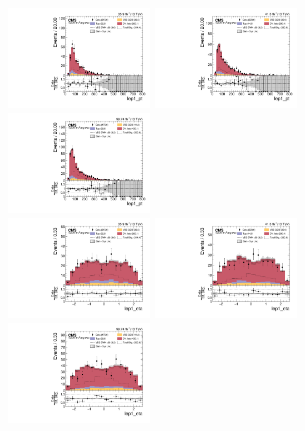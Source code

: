 \begin{figure}[!ht]
  \centering
  \includegraphics[width=0.335\textwidth]{analysis_plots/2016_zv/cr_vjets_m/lep1_pt.pdf} \hspace{-10pt}
  \includegraphics[width=0.335\textwidth]{analysis_plots/2017_zv/cr_vjets_m/lep1_pt.pdf} \hspace{-10pt}
  \includegraphics[width=0.335\textwidth]{analysis_plots/2018_zv/cr_vjets_m/lep1_pt.pdf} \hspace{-10pt} \\
  \includegraphics[width=0.335\textwidth]{analysis_plots/2016_zv/cr_vjets_m/lep1_eta.pdf} \hspace{-10pt}
  \includegraphics[width=0.335\textwidth]{analysis_plots/2017_zv/cr_vjets_m/lep1_eta.pdf} \hspace{-10pt}
  \includegraphics[width=0.335\textwidth]{analysis_plots/2018_zv/cr_vjets_m/lep1_eta.pdf} \hspace{-10pt} \\

\end{figure}
